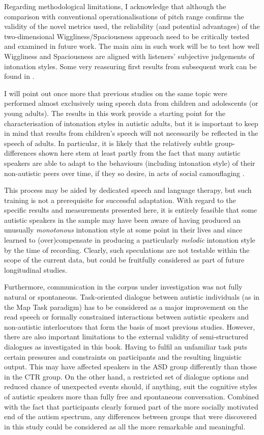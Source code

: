 Regarding methodological limitations, I acknowledge that although the comparison with conventional operationalisations of pitch range confirms the validity of the novel metrics used, the reliability (and potential advantages) of the two-dimensional Wiggliness/Spaciousness approach need to be critically tested and examined in future work. The main aim in such work will be to test how well Wiggliness and Spaciousness are aligned with listeners' subjective judgements of intonation styles. Some very reassuring first results from subsequent work can be found in \citet{wehrleEvaluatingProsodicAspects2023}.

I will point out once more that previous studies on the same topic were performed almost exclusively using speech data from children and adolescents (or young adults). The results in this work provide a starting point for the characterisation of intonation styles in autistic adults, but it is important to keep in mind that results from children's speech will not necessarily be reflected in the speech of adults. In particular, it is likely that the relatively subtle group-differences shown here stem at least partly from the fact that many autistic speakers are able to adapt to the behaviours (including intonation style) of their non-autistic peers over time, if they so desire, in acts of social camouflaging \citep{hullPuttingMyBest2017,laiQuantifyingExploringCamouflaging2017}.

This process may be aided by dedicated speech and language therapy, but such training is not a prerequisite for successful adaptation. With regard to the specific results and measurements presented here, it is entirely feasible that some autistic speakers in the sample may have been aware of having produced an unusually \emph{monotonous} intonation style at some point in their lives and since learned to (over)compensate in producing a particularly \emph{melodic} intonation style by the time of recording. Clearly, such speculations are not testable within the scope of the current data, but could be fruitfully considered as part of future longitudinal studies.

Furthermore, communication in the corpus under investigation was not fully natural or spontaneous. Task-oriented dialogue between autistic individuals (as in the Map Task paradigm) has to be considered as a major improvement on the read speech or formally constrained interactions between autistic speakers and non-autistic interlocutors that form the basis of most previous studies. However, there are also important limitations to the external validity of semi-structured dialogues as investigated in this book. Having to fulfil an unfamiliar task puts certain pressures and constraints on participants and the resulting linguistic output. This may have affected speakers in the ASD group differently than those in the CTR group. On the other hand, a restricted set of dialogue options and reduced chance of unexpected events should, if anything, suit the cognitive styles of autistic speakers more than fully free and spontaneous conversation. Combined with the fact that participants clearly formed part of the more socially motivated end of the autism spectrum, any differences between groups that were discovered in this study could be considered as all the more remarkable and meaningful.
